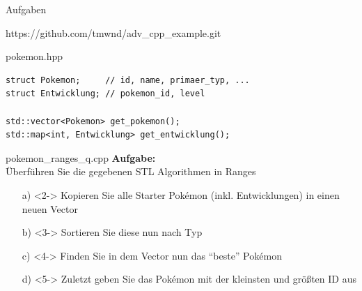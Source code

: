 \begin{frame}{Aufgaben}
    \begin{center}
        https://github.com/tmwnd/adv\_cpp\_example.git
    \end{center}
\end{frame}

\begin{frame}[fragile]{pokemon.hpp}
    \begin{verbatim}
struct Pokemon;     // id, name, primaer_typ, ...
struct Entwicklung; // pokemon_id, level

std::vector<Pokemon> get_pokemon();
std::map<int, Entwicklung> get_entwicklung();
    \end{verbatim}
\end{frame}



\begin{frame}{pokemon\_ranges\_q.cpp}
    \textbf{Aufgabe:}\\
    Überführen Sie die gegebenen STL Algorithmen in Ranges

    \vspace{1.5em}

    \begin{enumerate} %
        \item[a)]<2-> Kopieren Sie alle Starter Pokémon (inkl. Entwicklungen) in einen neuen Vector
        \item[b)]<3-> Sortieren Sie diese nun nach Typ
        \item[c)]<4-> Finden Sie in dem Vector nun das \enquote{beste} Pokémon
        \item[d)]<5-> Zuletzt geben Sie das Pokémon mit der kleinsten und größten ID aus
    \end{enumerate}
\end{frame}

